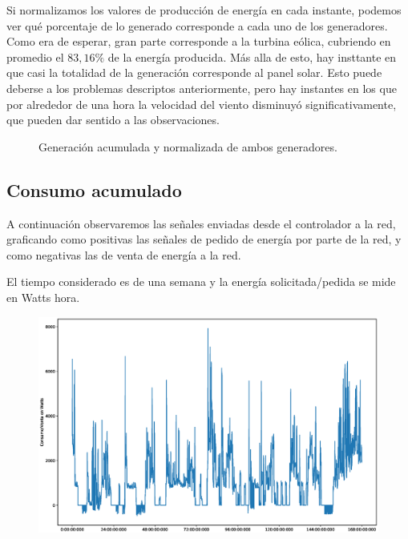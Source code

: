 Si normalizamos los valores de producción de energía en cada instante,
podemos ver qué porcentaje de lo generado corresponde a cada uno de los
generadores. Como era de esperar, gran parte corresponde a la turbina
eólica, cubriendo en promedio el \(83,16\%\) de la energía producida.
Más alla de esto, hay insttante en que casi la totalidad de la
generación corresponde al panel solar. Esto puede deberse a los
problemas descriptos anteriormente, pero hay instantes en los que por
alrededor de una hora la velocidad del viento disminuyó
significativamente, que pueden dar sentido a las observaciones.

\begin{figure}
    \begin{center}
    \end{center}
    \caption{Generación acumulada y normalizada de ambos generadores.}
\end{figure}

\subsection{Consumo acumulado}
A continuación observaremos las señales enviadas desde el controlador a la red, graficando
como positivas las señales de pedido de energía por parte de la red, y como negativas las
de venta de energía a la red.

El tiempo considerado es de una semana y la energía solicitada/pedida se mide en Watts hora.

\begin{figure}[H]
    \centering
    \includegraphics[scale=0.3]{images/cons.eps}
\end{figure}

